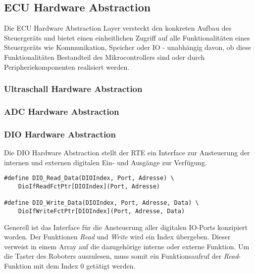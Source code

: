\subsection{ECU Hardware Abstraction}

Die ECU Hardware Abstraction Layer versteckt den konkreten Aufbau des Steuergeräts und bietet einen einheitlichen Zugriff auf alle Funktionalitäten eines Steuergeräts wie Kommunikation, Speicher oder IO - unabhängig davon, ob diese Funktionalitäten Bestandteil des Mikrocontrollers sind oder durch Peripheriekomponenten realisiert werden.


\subsubsection{Ultraschall Hardware Abstraction}


\subsubsection{ADC Hardware Abstraction}

\subsubsection{DIO Hardware Abstraction}

Die DIO Hardware Abstraction stellt der RTE ein Interface zur Ansteuerung der internen und externen digitalen Ein- und Ausgänge zur Verfügung.

\begin{lstlisting}[frame=single,caption={DIO Interface},captionpos=b]  
#define DIO_Read_Data(DIOIndex, Port, Adresse) \
	DioIfReadFctPtr[DIOIndex](Port, Adresse)
	
#define DIO_Write_Data(DIOIndex, Port, Adresse, Data) \
	DioIfWriteFctPtr[DIOIndex](Port, Adresse, Data)
\end{lstlisting}\newline\newline
%
%
Generell ist das Interface für die Ansteuerung aller digitalen IO-Ports konzipiert worden.
Der Funktionen \textit{Read} und \textit{Write} wird ein Index übergeben. Dieser verweist in einem Array auf die dazugehörige interne oder externe Funktion.\newline\newline
%
Um die Taster des Roboters auszulesen, muss somit ein Funktionsaufruf der \textit{Read}-Funktion mit dem Index 0 getätigt werden.

